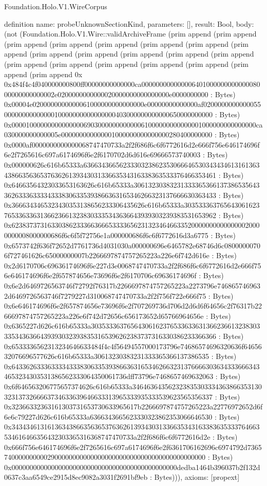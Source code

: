 \begin{lexlean}{Foundation.Holo.V1.WireCorpus}
\begin{semanticmodule}
definition{
  name: probeUnknownSectionKind,
  parameters: [],
  result: Bool,
  body: (not (Foundation.Holo.V1.Wire::validArchiveFrame (prim append (prim append (prim append (prim append (prim append (prim append (prim append (prim append (prim append (prim append (prim append (prim append (prim append (prim append (prim append (prim append (prim append (prim append (prim append (prim append 0x 0x484f4c4f040000000800ff00000000000000ca00000000000000640100000000000008000000000000002e0200000000000020000000000000000e0000000000 : Bytes) 0x00004e0200000000000061000000000000000e00000000000000af02000000000000550000000000000010000000000000000403000000000000650000000000 : Bytes) 0x00001000000000000000690300000000000061000000000000001000000000000000ca030000000000005e000000000000001000000000000000280400000000 : Bytes) 0x0000af0000000000000068747470733a2f2f686f6c6f6772616d2e666f756e646174696f6e2f7265616c697a6174696f6e2f6170702d6d616e69666573740003 : Bytes) 0x000000626c616b65333a636634366562333032386235306664653034343461316136343866356365376362613934303133663534316338363533376466353461 : Bytes) 0x64663564323033653163626c616b65333a3061323038323133336536613738653564336263336333343338306335393866363165346266323137666630363433 : Bytes) 0x3666343465323430353138656233306435626c616b65333a30353336376564306162376533633631366236613238303335343636643939303239383531653962 : Bytes) 0x6238373731633038623336636665333365623132346466335200000000000000020000000008000000686f6c6f5f72756e1a000000686f6c6f6772616d3a6775 : Bytes) 0x6573742f636f72652d7761736d4031030a000000696e6465782e68746d6c08000000706f727461626c65000000007b2266697874757265223a226e6f742d616e : Bytes) 0x2d6170706c69636174696f6e227d3e0068747470733a2f2f686f6c6f6772616d2e666f756e646174696f6e2f657874656e73696f6e2f6170706c69636174696f : Bytes) 0x6e2d6469726563746f72792f76317b2266697874757265223a2273796e7468657469632d6469726563746f7279227d310068747470733a2f2f756f722e666f75 : Bytes) 0x6e646174696f6e2f657874656e73696f6e2f707269736d706d2d6d6f64656c2f76317b2266697874757265223a226e6f742d72656c656173652d65766964656e : Bytes) 0x6365227d626c616b65333a3035333637656430616237653363363136623661323830333534363664393930323938353165396262383737316330386233366366 : Bytes) 0x6533336562313234646633484f4c4f56494557000173796e74686574696320636f6465632076696577626c616b65333a30613230383231333365366137386535 : Bytes) 0x6433626333633334333830633539386636316534626632313766663036343336663434653234303531386562333064350061736dff73796e7468657469632063 : Bytes) 0x6f646563206775657374626c616b65333a3464636435623238353033343638663531303231373266663734633639646633313965333935333539623565356337 : Bytes) 0x32366332363161303731653730633965617b2266697874757265223a22776972652d6f6e6c79227d626c616b65333a6366343665623330323862353066646530 : Bytes) 0x343434613161363438663563653763626139343031336635343163383635333764663534616466356432303365316368747470733a2f2f686f6c6f6772616d2e : Bytes) 0x666f756e646174696f6e2f7265616c697a6174696f6e2f6361706162696c6974792d736574000000000029000000000000000000000000000000000000000000 : Bytes) 0x0000000000000000000000000000000000000000000000dedba1464b396037b2f132d0637c3aa6549ce2915d8ec9082a3031f2691bf9eb : Bytes))),
  axioms: [propext]
}


\end{semanticmodule}
\end{lexlean}
